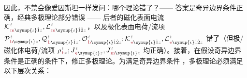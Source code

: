 因此，不禁会像爱因斯坦一样发问：哪个理论错了？—— 答案是奇异边界条件正确，经典多极理论部分错误 —— 后者的磁化表面电流 ${\mathcal{K}}^{\;\!\mathcolor{gray}{t}}_{\;\!\textcolor{Maroon}{\text{m}} \symup{\iota}\hat{1} \mathcolor{gray}{z}},{\mathcal{L}}^{\;\!\mathcolor{gray}{t}}_{\;\!\textcolor{Maroon}{\text{m}} \symup{\iota}\hat{1}\hat{2} \mathcolor{gray}{z}}$，以及极化表面电荷/流项 ${\mathcal{P}}^{\;\!\mathcolor{gray}{t}}_{\;\!\textcolor{Maroon}{\text{b}} \symup{\iota} \mathcolor{gray}{z}},{\mathcal{Q}}^{\;\!\mathcolor{gray}{t}}_{\;\!\textcolor{Maroon}{\text{b}} \symup{\iota}\hat{1} \mathcolor{gray}{z}},{\mathcal{O}}^{\;\!\mathcolor{gray}{t}}_{\;\!\textcolor{Maroon}{\text{b}} \symup{\iota}\hat{1}\hat{2} \mathcolor{gray}{z}};{\mathcal{K}}^{\;\!\mathcolor{gray}{t}}_{\;\!\textcolor{Maroon}{\text{e}} \symup{\iota}\hat{1} \mathcolor{gray}{z}},{\mathcal{L}}^{\;\!\mathcolor{gray}{t}}_{\;\!\textcolor{Maroon}{\text{e}} \symup{\iota}\hat{1}\hat{2} \mathcolor{gray}{z}}$ 错了（但极/磁化体电荷/流项 ${\rho}^{\;\!\mathcolor{gray}{t}}_{\;\!\textcolor{Maroon}{\text{b}} \mathcolor{gray}{z}};{J}^{\;\!\mathcolor{gray}{t}}_{\;\!\textcolor{Maroon}{\text{e}} \symup{\iota} \mathcolor{gray}{z}},{J}^{\;\!\mathcolor{gray}{t}}_{\;\!\textcolor{Maroon}{\text{m}} \symup{\iota} \mathcolor{gray}{z}}$ 均正确）。接着，在假设奇异边界条件是正确的条件下，修正多极理论。为满足奇异边界条件 ，多极理论必须满足以下层次关系：
